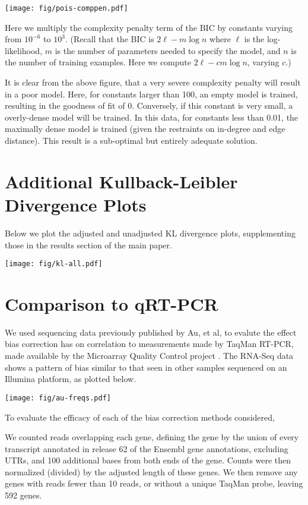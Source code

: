 \documentclass[letterpaper]{article}
\begin{document}
\begin{center}
\texttt{[image: fig/pois-comppen.pdf]}
\end{center}

Here we multiply the complexity penalty term of the BIC by constants varying
from $10^{-6}$ to $10^{3}$. (Recall that the BIC is $2\ell - m \log n$ where
$\ell$ is the log-likelihood, $m$ is the number of parameters needed to specify
the model, and $n$ is the number of training examples. Here we compute $2 \ell -
c m \log n$, varying $c$.)

It is clear from the above figure, that a very severe complexity penalty will
result in a poor model. Here, for constants larger than 100, an empty model is
trained, resulting in the goodness of fit of 0. Conversely, if this constant is
very small, a overly-dense model will be trained.  In this data, for constants
less than 0.01, the maximally dense model is trained (given the restraints on
in-degree and edge distance). This result is a sub-optimal but entirely adequate
solution.


\section{Additional Kullback-Leibler Divergence Plots}

Below we plot the adjusted and unadjusted KL divergence plots, supplementing
those in the results section of the main paper.


\texttt{[image: fig/kl-all.pdf]}



\section{Comparison to qRT-PCR}

We used sequencing data previously published by Au, et al, \cite{Au2010} to
evalute the effect bias correction has on correlation to measurements made by
TaqMan RT-PCR, made available by the Microarray Quality Control project
\cite{Shi2006}. The RNA-Seq data shows a pattern of bias similar to that seen in
other samples sequenced on an Illumina platform, as plotted below.

\centerline{\texttt{[image: fig/au-freqs.pdf]}}

To evaluate the efficacy of each of the bias correction methods considered, 

We counted reads overlapping each gene, defining the gene by the union of every
transcript annotated in release 62 of the Ensembl gene annotations, excluding
UTRs, and 100 additional bases from both ends of the gene. Counts were then
normalized (divided) by the adjusted length of these genes.  We then remove any
genes with reads fewer than 10 reads, or without a unique TaqMan probe, leaving
592 genes.
\end{document}
